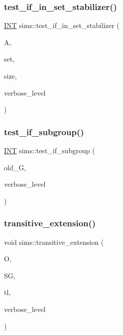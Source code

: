 \subsubsection{\texorpdfstring{test\+\_\+if\+\_\+in\+\_\+set\+\_\+stabilizer()}{test\_if\_in\_set\_stabilizer()}}
{\footnotesize\ttfamily \mbox{\hyperlink{galois_8h_a09fddde158a3a20bd2dcadb609de11dc}{I\+NT}} sims\+::test\+\_\+if\+\_\+in\+\_\+set\+\_\+stabilizer (\begin{DoxyParamCaption}\item[{\mbox{\hyperlink{classaction}{action}} $\ast$}]{A,  }\item[{\mbox{\hyperlink{galois_8h_a09fddde158a3a20bd2dcadb609de11dc}{I\+NT}} $\ast$}]{set,  }\item[{\mbox{\hyperlink{galois_8h_a09fddde158a3a20bd2dcadb609de11dc}{I\+NT}}}]{size,  }\item[{\mbox{\hyperlink{galois_8h_a09fddde158a3a20bd2dcadb609de11dc}{I\+NT}}}]{verbose\+\_\+level }\end{DoxyParamCaption})}

\mbox{\label{classsims_a60f53e947f3a0949805cf0e422749bf5}} 
\subsubsection{\texorpdfstring{test\+\_\+if\+\_\+subgroup()}{test\_if\_subgroup()}}
{\footnotesize\ttfamily \mbox{\hyperlink{galois_8h_a09fddde158a3a20bd2dcadb609de11dc}{I\+NT}} sims\+::test\+\_\+if\+\_\+subgroup (\begin{DoxyParamCaption}\item[{\mbox{\hyperlink{classsims}{sims}} $\ast$}]{old\+\_\+G,  }\item[{\mbox{\hyperlink{galois_8h_a09fddde158a3a20bd2dcadb609de11dc}{I\+NT}}}]{verbose\+\_\+level }\end{DoxyParamCaption})}

\mbox{\label{classsims_a325b6193239b8d4c8798a47ec1b834ac}} 
\subsubsection{\texorpdfstring{transitive\+\_\+extension()}{transitive\_extension()}}
{\footnotesize\ttfamily void sims\+::transitive\+\_\+extension (\begin{DoxyParamCaption}\item[{\mbox{\hyperlink{classschreier}{schreier}} \&}]{O,  }\item[{\mbox{\hyperlink{classvector__ge}{vector\+\_\+ge}} \&}]{SG,  }\item[{\mbox{\hyperlink{galois_8h_a09fddde158a3a20bd2dcadb609de11dc}{I\+NT}} $\ast$}]{tl,  }\item[{\mbox{\hyperlink{galois_8h_a09fddde158a3a20bd2dcadb609de11dc}{I\+NT}}}]{verbose\+\_\+level }\end{DoxyParamCaption})}

